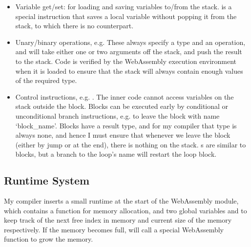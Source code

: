 \begin{itemize}
\item Variable get/set:  for loading and saving variables to/from the stack.  is a special instruction that saves a local variable without popping it from the stack, to which there is no  counterpart.
\item Unary/binary operations, e.g.  These always specify a type and an operation, and will take either one or two arguments off the stack, and push the result to the stack. Code is verified by the WebAssembly execution environment when it is loaded to ensure that the stack will always contain enough values of the required type.
\item Control instructions, e.g. . The inner code cannot access variables on the stack outside the block. Blocks can be executed early by conditional or unconditional branch instructions, e.g.  to leave the block with name `block\_name'. Blocks have a result type, and for my compiler that type is always none, and hence I must ensure that whenever we leave the block (either by jump or at the end), there is nothing on the stack. s are similar to blocks, but a branch to the loop's name will restart the loop block.
\end{itemize}

\subsection{Runtime System}
My compiler inserts a small runtime at the start of the WebAssembly module, which contains a function  for memory allocation, and two global variables  and  to keep track of the next free index in memory and current size of the memory respectively. If the memory becomes full,  will call a special WebAssembly function  to grow the memory.

